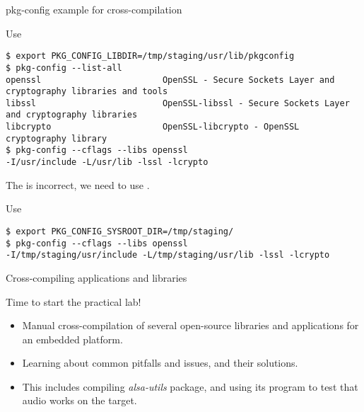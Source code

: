 \begin{frame}[fragile]{pkg-config example for cross-compilation}
  \begin{block}{Use }
    {\scriptsize
\begin{verbatim}
$ export PKG_CONFIG_LIBDIR=/tmp/staging/usr/lib/pkgconfig
$ pkg-config --list-all
openssl                        OpenSSL - Secure Sockets Layer and cryptography libraries and tools
libssl                         OpenSSL-libssl - Secure Sockets Layer and cryptography libraries
libcrypto                      OpenSSL-libcrypto - OpenSSL cryptography library
$ pkg-config --cflags --libs openssl
-I/usr/include -L/usr/lib -lssl -lcrypto
\end{verbatim}
    }
  \end{block}

  The  is incorrect, we need to use
  .

  \begin{block}{Use }
    {\scriptsize
\begin{verbatim}
$ export PKG_CONFIG_SYSROOT_DIR=/tmp/staging/
$ pkg-config --cflags --libs openssl
-I/tmp/staging/usr/include -L/tmp/staging/usr/lib -lssl -lcrypto
\end{verbatim}
    }
  \end{block}
\end{frame}

\setuplabframe
{Cross-compiling applications and libraries}
{
  Time to start the practical lab!
  \begin{itemize}
  \item Manual cross-compilation of several open-source libraries and
    applications for an embedded platform.
  \item Learning about common pitfalls and issues, and their
    solutions.
  \item This includes compiling {\em alsa-utils} package,
    and using its  program to test that
    audio works on the target.
  \end{itemize}
}

